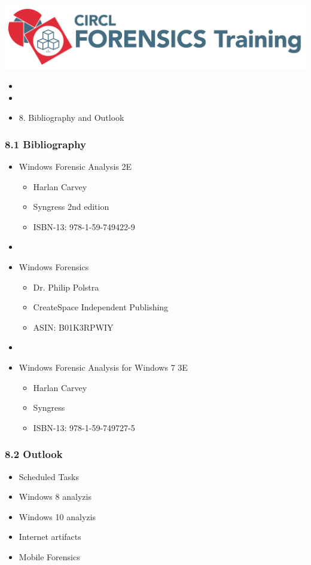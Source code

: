 %
%



\begin{frame}
    \includegraphics[scale=0.3]{images/logo-circl-Forensics.png}
    \begin{itemize}
        \item[]
        \item[]
        \item[] 8. Bibliography and Outlook
    \end{itemize}
\end{frame}


\begin{frame}
  \frametitle{8.1 Bibliography}
  \begin{itemize}
      \item Windows Forensic Analysis 2E
        \begin{itemize}
            \item[] Harlan Carvey
            \item[] Syngress 2nd edition
            \item[] ISBN-13: 978-1-59-749422-9
        \end{itemize}
      \item[]
      \item Windows Forensics
        \begin{itemize}
            \item[] Dr. Philip Polstra
            \item[] CreateSpace Independent Publishing
            \item[] ASIN: B01K3RPWIY
        \end{itemize}
      \item[]
      \item Windows Forensic Analysis for Windows 7 3E
        \begin{itemize}
            \item[] Harlan Carvey
            \item[] Syngress
            \item[] ISBN-13: 978-1-59-749727-5
        \end{itemize}
  \end{itemize}
\end{frame}


\begin{frame}
  \frametitle{8.2 Outlook}
  \begin{itemize}
      \item Scheduled Tasks
      \item Windows 8 analyzis
      \item Windows 10 analyzis
      \item Internet artifacts
      \item Mobile Forensics
  \end{itemize}
\end{frame}


